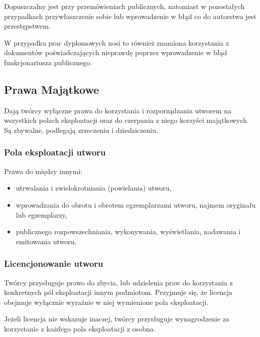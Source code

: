\documentclass{article}
\begin{document}
Dopuszczalny jest przy przemówieniach publicznych, natomiast w pozostałych przypadkach przywłaszczenie sobie lub wprowadzenie w błąd co do autorstwa jest przestępstwem.

W przypadku prac dyplomowych nosi to również znamiona korzystania z dokumentów poświadczających nieprawdę poprzez wprowadzenie w błąd funkcjonariusza publicznego.

\subsection{Prawa Majątkowe}

Dają twórcy wyłączne prawa do korzystania i rozporządzania utworem na wszystkich polach eksploatacji oraz do czerpania z niego korzyści majątkowych. Są zbywalne, podlegają zrzeczeniu i dziedziczeniu.

\subsubsection{Pola eksploatacji utworu}

Prawa do między innymi:
\begin{itemize}
  \item utrwalania i zwielokrotniania (powielania) utworu,
  \item wprowadzania do obrotu i obrotem egzemplarzami utworu, najmem oryginału lub egzemplarzy,
  \item publicznego rozpowszechniania, wykonywania, wyświetlania, nadawania i emitowania utworu.
\end{itemize}

\subsubsection{Licencjonowanie utworu}

Twórcy przysługuje prawo do zbycia, lub udzielenia praw do korzystania z konkretnych pól eksploatacji innym podmiotom.
Przyjmuje się, że licencja obejmuje wyłącznie wyraźnie w niej wymienione pola eksploatacji.

Jeżeli licencja nie wskazuje inaczej, twórcy przysługuje wynagrodzenie za korzystanie z każdego pola eksploatacji z osobna.
\end{document}
